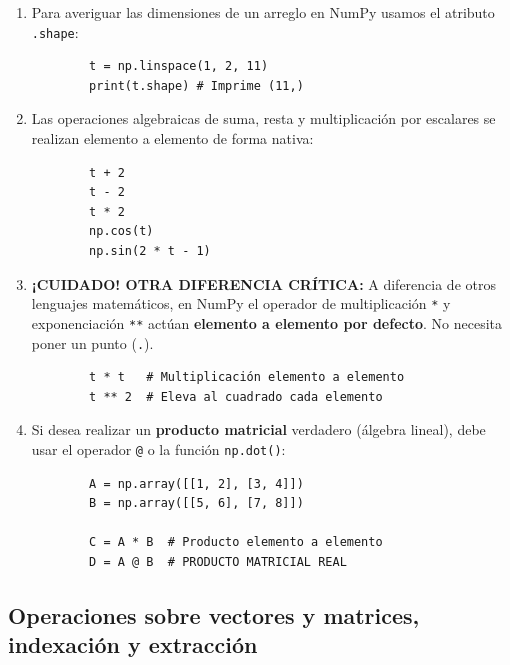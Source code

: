 \begin{enumerate}
	\item Para averiguar las dimensiones de un arreglo en NumPy usamos el atributo \texttt{.shape}:
	\begin{verbatim}
		t = np.linspace(1, 2, 11)
		print(t.shape) # Imprime (11,)
	\end{verbatim}
	
	\item Las operaciones algebraicas de suma, resta y multiplicación por escalares se realizan elemento a elemento de forma nativa:
	\begin{verbatim}
		t + 2
		t - 2
		t * 2
		np.cos(t)
		np.sin(2 * t - 1)
	\end{verbatim}
	
	\item \textbf{¡CUIDADO! OTRA DIFERENCIA CRÍTICA:} A diferencia de otros lenguajes matemáticos, en NumPy el operador de multiplicación \texttt{*} y exponenciación \texttt{**} actúan \textbf{elemento a elemento por defecto}. No necesita poner un punto (\texttt{.}).
	\begin{verbatim}
		t * t   # Multiplicación elemento a elemento
		t ** 2  # Eleva al cuadrado cada elemento
	\end{verbatim}
	
	\item Si desea realizar un \textbf{producto matricial} verdadero (álgebra lineal), debe usar el operador \texttt{@} o la función \texttt{np.dot()}:
	\begin{verbatim}
		A = np.array([[1, 2], [3, 4]])
		B = np.array([[5, 6], [7, 8]])
		
		C = A * B  # Producto elemento a elemento
		D = A @ B  # PRODUCTO MATRICIAL REAL
	\end{verbatim}
\end{enumerate}

\subsection{Operaciones sobre vectores y matrices, indexación y extracción}

